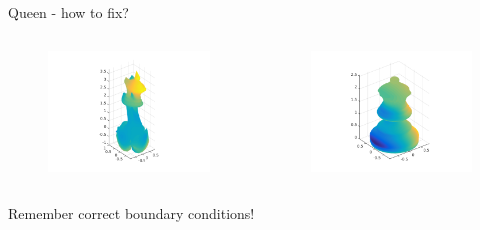 \documentclass[screen]{beamer}
\begin{document}



















\begin{frame}
Queen - how to fix?
\begin{columns}   
    \begin{column}{.5\linewidth}
        \begin{figure}
  		\includegraphics[scale=0.45]{figures/queen_broken}
  		\end{figure}
    \end{column}   
    \begin{column}{.5\linewidth}

        \begin{figure}
  		\includegraphics[scale=0.45]{figures/queen_fixed}
  		\end{figure}
    \end{column}
  \end{columns}
Remember correct boundary conditions!
\end{frame}
\end{document}
